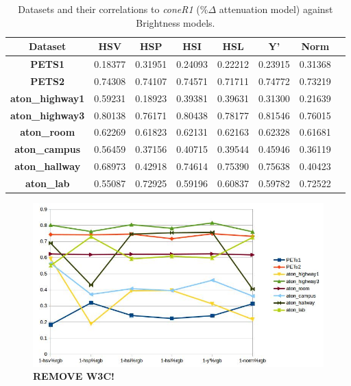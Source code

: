 \documentclass[12pt]{report}
\begin{document}
\begin{table}
\centering
\begin{tabular}{ |c|c|c|c|c|c|c|c| }
	\hline
	\textbf{Dataset} & \textbf{HSV} & \textbf{HSP} & \textbf{HSI} & \textbf{HSL}& \textbf{Y'} & \textbf{Norm} \\
	\hline
	\hline
	\textbf{PETS1} & 0.18377 & 0.31951 & 0.24093 & 0.22212 & 0.23915 & 0.31368 \\
	\hline
	\textbf{PETS2} & 0.74308 & 0.74107 & 0.74571 & 0.71711 & 0.74772 & 0.73219 \\
	\hline
	\textbf{aton\_highway1} & 0.59231 & 0.18923 & 0.39381 & 0.39631 & 0.31300 & 0.21639 \\
	\hline
	\textbf{aton\_highway3} & 0.80138 & 0.76171 & 0.80438 & 0.78177 & 0.81546 & 0.76015 \\
	\hline
	\textbf{aton\_room} & 0.62269 & 0.61823 & 0.62131 & 0.62163 & 0.62328 & 0.61681 \\
	\hline
	\textbf{aton\_campus} & 0.56459 & 0.37156 & 0.40715 & 0.39544 & 0.45946 & 0.36119 \\
	\hline
	\textbf{aton\_hallway} & 0.68973 & 0.42918 & 0.74614 & 0.75390 & 0.75638 & 0.40423 \\
	\hline
	\textbf{aton\_lab} & 0.55087 & 0.72925 & 0.59196 & 0.60837 & 0.59782 & 0.72522 \\
	\hline
\end{tabular}
\caption{Datasets and their correlations to \textit{coneR1} (\%$\Delta$ attenuation model) against Brightness models.}
\label{table:brightness_corr_rgb}
\end{table}

\begin{figure}
  \includegraphics[width=\linewidth]{figures/brightness/rgb/correlation_x.jpg}
  \caption{\textbf{REMOVE W3C!}}
\label{fig:brightness_corr_rgb}
\end{figure}
\end{document}
